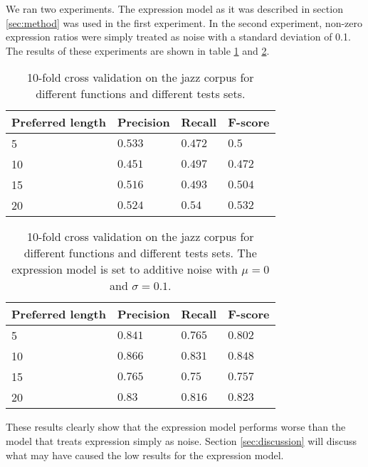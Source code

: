 We ran two experiments. The expression model as it was described in section \ref{sec:method} was used in the first experiment. In the second experiment, non-zero expression ratios were simply treated as noise with a standard deviation of 0.1. The results of these experiments are shown in table \ref{tab:results_expression} and \ref{tab:results_noise}.

\begin{table}
\centering
\caption{10-fold cross validation on the jazz corpus for different functions and different tests sets.}
\label{tab:results_expression}
\begin{tabular}{llll}
\hline
\textbf{Preferred length} & \textbf{Precision} & \textbf{Recall} & \textbf{F-score}\\
\hline
\hline
5 & $0.533$ & $0.472$ & $0.5$\\
10 & $0.451$ & $0.497$ & $0.472$\\
15 & $0.516$ & $0.493$ & $0.504$\\
20 & $0.524$ & $0.54$ & $0.532$\\
\hline

\end{tabular}
\end{table}

\begin{table}
\centering
\caption{10-fold cross validation on the jazz corpus for different functions and different tests sets. The expression model is set to additive noise with $\mu = 0$ and $\sigma = 0.1$.}
\label{tab:results_noise}
\begin{tabular}{llll}
\hline
\textbf{Preferred length} & \textbf{Precision} & \textbf{Recall} & \textbf{F-score}\\
\hline
\hline
5 & $0.841$ & $0.765$ & $0.802$\\
10 & $0.866$ & $0.831$ & $0.848$\\
15 & $0.765$ & $0.75$ & $0.757$\\
20 & $0.83$ & $0.816$ & $0.823$\\
\hline

\end{tabular}
\end{table}

These results clearly show that the expression model performs worse than the model that treats expression simply as noise. Section \ref{sec:discussion} will discuss what may have caused the low results for the expression model.